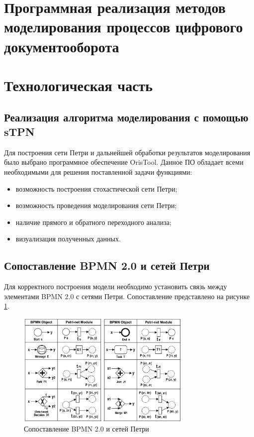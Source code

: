 \section{Программная реализация методов моделирования процессов цифрового документооборота}

\section{Технологическая часть}
\subsection{Реализация алгоритма моделирования с помощью sTPN}

Для построения сети Петри и дальнейшей обработки результатов моделирования было выбрано программное обеспечение OrisTool\cite{oris}. Данное ПО обладает всеми необходимыми для решения поставленной задачи функциями:

\begin{itemize}
	\item возможность построения стохастической сети Петри;
	\item возможность проведения моделирования сети Петри;
	\item наличие прямого и обратного переходного анализа;
	\item визуализация полученных данных.
\end{itemize}

\subsection{Сопоставление BPMN 2.0 и сетей Петри}

Для корректного построения модели необходимо установить связь между элементами BPMN 2.0 с сетями Петри. Сопоставление представлено на рисунке \ref{fig:mapping}.

\begin{figure}[h!btp]
	\centering
	\includegraphics[width=0.75\textwidth]{../inc/mapping.png}
	\caption{Сопоставление BPMN 2.0 и сетей Петри}
	\label{fig:mapping}
\end{figure}


